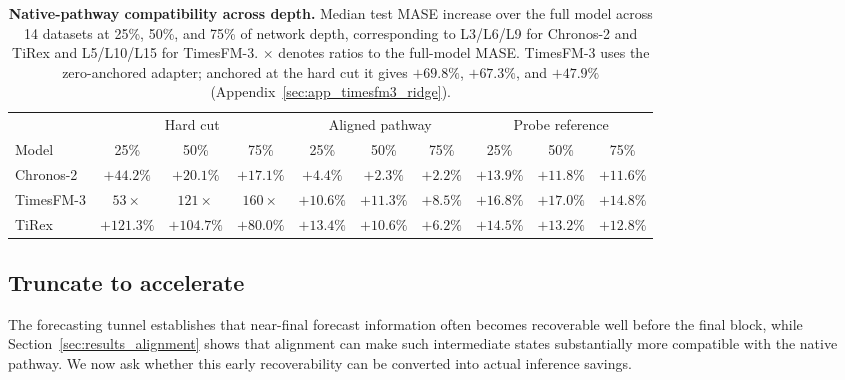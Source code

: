 \documentclass{article} %
\begin{document}
\begin{table}[t]
\centering
\caption{\textbf{Native-pathway compatibility across depth.} Median test MASE increase over the full model across 14 datasets at 25\%, 50\%, and 75\% of network depth, corresponding to L3/L6/L9 for Chronos-2 and TiRex and L5/L10/L15 for TimesFM-3. $\times$ denotes ratios to the full-model MASE. TimesFM-3 uses the zero-anchored adapter; anchored at the hard cut it gives $+69.8\%$, $+67.3\%$, and $+47.9\%$ (Appendix~\ref{sec:app_timesfm3_ridge}).}
\vspace{4pt}
\label{tab:h3_depth}
\small
\setlength{\tabcolsep}{4pt}
\begin{tabular}{@{}lccc ccc ccc@{}}
\toprule
& \multicolumn{3}{c}{Hard cut}
& \multicolumn{3}{c}{Aligned pathway}
& \multicolumn{3}{c}{Probe reference} \\
\cmidrule(lr){2-4}
\cmidrule(lr){5-7}
\cmidrule(l){8-10}
Model
& 25\% & 50\% & 75\%
& 25\% & 50\% & 75\%
& 25\% & 50\% & 75\% \\
\midrule
Chronos-2
& $+44.2\%$ & $+20.1\%$ & $+17.1\%$
& $+4.4\%$ & $+2.3\%$ & $+2.2\%$
& $+13.9\%$ & $+11.8\%$ & $+11.6\%$ \\

TimesFM-3
& $53\times$ & $121\times$ & $160\times$
& $+10.6\%$ & $+11.3\%$ & $+8.5\%$
& $+16.8\%$ & $+17.0\%$ & $+14.8\%$ \\

TiRex
& $+121.3\%$ & $+104.7\%$ & $+80.0\%$
& $+13.4\%$ & $+10.6\%$ & $+6.2\%$
& $+14.5\%$ & $+13.2\%$ & $+12.8\%$ \\
\bottomrule
\end{tabular}
\end{table}

\subsection{Truncate to accelerate}
\label{sec:results_acceleration}

The forecasting tunnel establishes that near-final forecast information often becomes recoverable well before the final block, while Section~\ref{sec:results_alignment} shows that alignment can make such intermediate states substantially more compatible with the native pathway. We now ask whether this early recoverability can be converted into actual inference savings.
\end{document}
